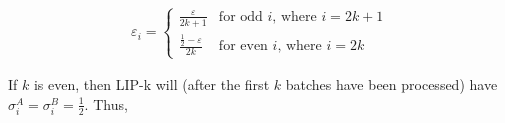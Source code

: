 \begin{align*}
\varepsilon_i = 
    \begin{cases}
    \frac{\varepsilon}{2k+1} & \text{for odd $i$, where $i = 2k + 1$} \\ 
    \frac{\frac{1}{2} - \varepsilon}{2k} & \text{for even $i$, where $i = 2k$}
    \end{cases}
\end{align*}

If $k$ is even, then LIP-k will (after the first $k$ batches have been processed) have $\sigma^A_i = \sigma^B_i = \frac{1}{2}$. Thus,


